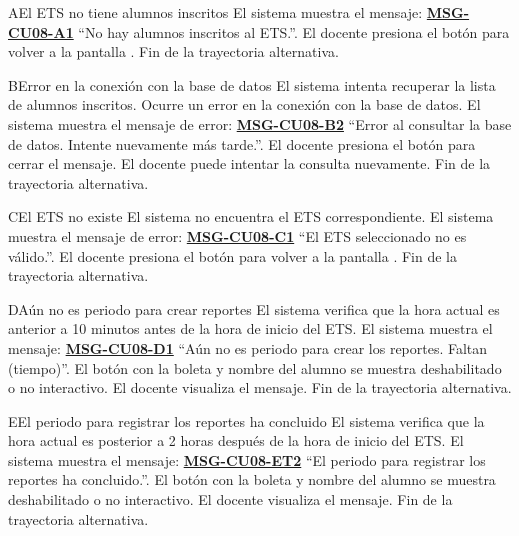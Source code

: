 \begin{UCtrayectoriaA}{A}{El ETS no tiene alumnos inscritos}
	\UCpaso El sistema muestra el mensaje: \textbf{\hyperref[msg:CU08-A1]{MSG-CU08-A1}}{ ``No hay alumnos inscritos al ETS.''}.
	\UCpaso[\UCactor] El docente presiona el botón  para volver a la pantalla .
	\UCpaso Fin de la trayectoria alternativa.
\end{UCtrayectoriaA}
\begin{UCtrayectoriaA}{B}{Error en la conexión con la base de datos}
	\UCpaso El sistema intenta recuperar la lista de alumnos inscritos.
	\UCpaso Ocurre un error en la conexión con la base de datos.
	\UCpaso El sistema muestra el mensaje de error: \textbf{\hyperref[msg:CU08-E2]{MSG-CU08-B2}}{ ``Error al consultar la base de datos. Intente nuevamente más tarde.''}.
	\UCpaso[\UCactor] El docente presiona el botón  para cerrar el mensaje.
	\UCpaso[\UCactor] El docente puede intentar la consulta nuevamente.
	\UCpaso Fin de la trayectoria alternativa.
\end{UCtrayectoriaA}
\begin{UCtrayectoriaA}{C}{El ETS no existe}
	\UCpaso El sistema no encuentra el ETS correspondiente.
	\UCpaso El sistema muestra el mensaje de error: \textbf{\hyperref[msg:CU08-C1]{MSG-CU08-C1}}{ ``El ETS seleccionado no es válido.''}.
	\UCpaso[\UCactor] El docente presiona el botón  para volver a la pantalla .
	\UCpaso Fin de la trayectoria alternativa.
\end{UCtrayectoriaA}
\begin{UCtrayectoriaA}{D}{Aún no es periodo para crear reportes}
	\UCpaso El sistema verifica que la hora actual es anterior a 10 minutos antes de la hora de inicio del ETS.
	\UCpaso El sistema muestra el mensaje: \textbf{\hyperref[msg:CU08-D1]{MSG-CU08-D1}}{ ``Aún no es periodo para crear los reportes. Faltan (tiempo)''}.
	\UCpaso El botón con la boleta y nombre del alumno se muestra deshabilitado o no interactivo.
	\UCpaso[\UCactor] El docente visualiza el mensaje.
	\UCpaso Fin de la trayectoria alternativa.
\end{UCtrayectoriaA}
\begin{UCtrayectoriaA}{E}{El periodo para registrar los reportes ha concluido}
	\UCpaso El sistema verifica que la hora actual es posterior a 2 horas después de la hora de inicio del ETS.
	\UCpaso El sistema muestra el mensaje: \textbf{\hyperref[msg:CU08-ET2]{MSG-CU08-ET2}}{ ``El periodo para registrar los reportes ha concluido.''}.
	\UCpaso El botón con la boleta y nombre del alumno se muestra deshabilitado o no interactivo.
	\UCpaso[\UCactor] El docente visualiza el mensaje.
	\UCpaso Fin de la trayectoria alternativa.
\end{UCtrayectoriaA}

